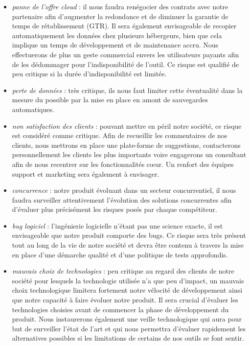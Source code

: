 \documentclass[10pt,twocolumn,a4paper,utf8x]{article}
\begin{document}
\begin{itemize}
\itemsep1pt\parskip0pt
\item
  \emph{panne de l'offre cloud} : il nous faudra renégocier des contrats
  avec notre partenaire afin d'augmenter la redondance et de diminuer la
  garantie de temps de rétablissement (GTR). Il sera également
  envisageable de recopier automatiquement les données chez plusieurs
  hébergeurs, bien que cela implique un temps de développement et de
  maintenance accru. Nous effectuerons de plus un geste commercial
  envers les utilisateurs payants afin de les dédommager pour
  l'indisponibilité de l'outil. Ce risque est qualifié de peu critique
  si la durée d'indisponibilité est limitée.
\item
  \emph{perte de données} : très critique, ils nous faut limiter cette
  éventualité dans la mesure du possible par la mise en place en amont
  de sauvegardes automatiques.
\item
  \emph{non satisfaction des clients} : pouvant mettre en péril notre
  société, ce risque est considéré comme critique. Afin de recueillir
  les commentaires de nos clients, nous mettrons en place une
  plate-forme de suggestions, contacterons personnellement les clients
  les plus importants voire engagerons un consultant afin de nous
  recentrer sur les fonctionnalités cœur. Un renfort des équipes support
  et marketing sera également à envisager.
\item
  \emph{concurrence} : notre produit évoluant dans un secteur
  concurrentiel, il nous faudra surveiller attentivement l'évolution des
  solutions concurrentes afin d'évaluer plus précisément les risques
  posés par chaque compétiteur.
\item
  \emph{bug logiciel} : l'ingénierie logicielle n'étant pas une science
  exacte, il est envisageable que notre produit comporte des bugs. Ce
  risque sera très présent tout au long de la vie de notre société et
  devra être contenu à travers la mise en place d'une démarche qualité
  et d'une politique de tests approfondis.
\item
  \emph{mauvais choix de technologies} : peu critique au regard des
  clients de notre société pour lesquels la technologie utilisée n'a que
  peu d'impact, un mauvais choix technologique limitera fortement notre
  vélocité de développement ainsi que notre capacité à faire évoluer
  notre produit. Il sera crucial d'évaluer les technologies choisies
  avant de commencer la phase de développement du produit. Nous
  instaurerons également une veille technologique qui aura pour but de
  surveiller l'état de l'art et qui nous permettra d'évaluer rapidement
  les alternatives possibles si les limitations de certains de nos
  outils se font sentir.
\end{itemize}
\end{document}
